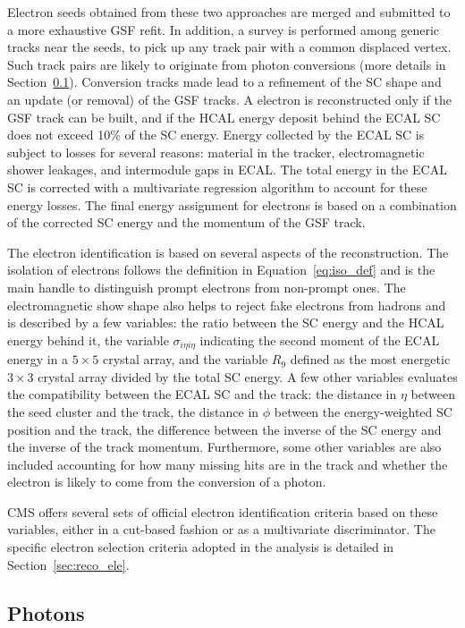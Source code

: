 Electron seeds obtained from these two approaches are merged and submitted to a more exhaustive GSF refit.
In addition, a survey is performed among generic tracks near the seeds, 
to pick up any track pair with a common displaced vertex.
Such track pairs are likely to originate from photon conversions (more details in Section~\ref{sec:reco_phot}).
Conversion tracks made lead to a refinement of the SC shape and an update (or removal) of the GSF tracks.
A electron is reconstructed only if the GSF track can be built, 
and if the HCAL energy deposit behind the ECAL SC does not exceed 10\% of the SC energy.
Energy collected by the ECAL SC is subject to losses for several reasons:
material in the tracker, electromagnetic shower leakages, and intermodule gaps in ECAL.
The total energy in the ECAL SC is corrected with a multivariate regression algorithm to account for these energy losses.
The final energy assignment for electrons is based on a combination of 
the corrected SC energy and the momentum of the GSF track.

The electron identification is based on several aspects of the reconstruction.
The isolation of electrons follows the definition in Equation~\ref{eq:iso_def} 
and is the main handle to distinguish prompt electrons from non-prompt ones.
The electromagnetic show shape also helps to reject fake electrons from hadrons 
and is described by a few variables: 
the ratio between the SC energy and the HCAL energy behind it,
the variable $\sigma_{i\eta{}i\eta}$ indicating the second moment of the ECAL energy in a $5 \times 5$ crystal array,
and the variable $R_{9}$ defined as the most energetic $3 \times 3$ crystal array divided by the total SC energy.
A few other variables evaluates the compatibility between the ECAL SC and the track:
the distance in $\eta$ between the seed cluster and the track,
the distance in $\phi$ between the energy-weighted SC position and the track,
the difference between the inverse of the SC energy and the inverse of the track momentum. 
Furthermore, some other variables are also included accounting for how many missing hits are in the track 
and whether the electron is likely to come from the conversion of a photon.

CMS offers several sets of official electron identification criteria based on these variables,
either in a cut-based fashion or as a multivariate discriminator.
The specific electron selection criteria adopted in the \hmm analysis is detailed in Section~\ref{sec:reco_ele}. 

\subsection{Photons}\label{sec:reco_phot}

